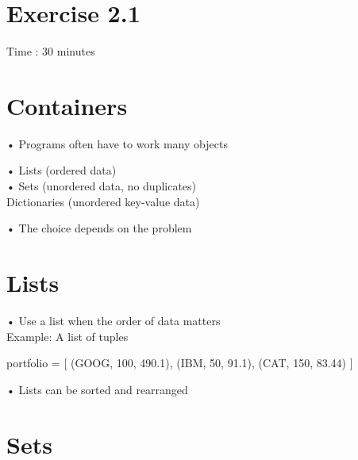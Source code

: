\documentclass[
  letterpaper,
  DIV=11,
  numbers=noendperiod]{scrreprt}
\newenvironment{Shaded}{\begin{snugshade}}{\end{snugshade}}
\newcommand{\DecValTok}[1]{\textcolor[rgb]{0.68,0.00,0.00}{#1}}
\newcommand{\FloatTok}[1]{\textcolor[rgb]{0.68,0.00,0.00}{#1}}
\newcommand{\NormalTok}[1]{\textcolor[rgb]{0.00,0.23,0.31}{#1}}
\newcommand{\OperatorTok}[1]{\textcolor[rgb]{0.37,0.37,0.37}{#1}}
\newcommand{\StringTok}[1]{\textcolor[rgb]{0.13,0.47,0.30}{#1}}
\begin{document}

\chapter{Exercise 2.1}\label{exercise-2.1}

Time : 30 minutes


\chapter{Containers}\label{containers}

• Programs often have to work many objects

• Lists (ordered data)\\
• Sets (unordered data, no duplicates)\\
Dictionaries (unordered key-value data)

• The choice depends on the problem


\chapter{Lists}\label{lists}

• Use a list when the order of data matters\\
Example: A list of tuples

\begin{Shaded}
\begin{Highlighting}[]
\NormalTok{portfolio }\OperatorTok{=}\NormalTok{ [}
\NormalTok{    (}\StringTok{\textquotesingle{}GOOG\textquotesingle{}}\NormalTok{, }\DecValTok{100}\NormalTok{, }\FloatTok{490.1}\NormalTok{),}
\NormalTok{    (}\StringTok{\textquotesingle{}IBM\textquotesingle{}}\NormalTok{, }\DecValTok{50}\NormalTok{, }\FloatTok{91.1}\NormalTok{),}
\NormalTok{    (}\StringTok{\textquotesingle{}CAT\textquotesingle{}}\NormalTok{, }\DecValTok{150}\NormalTok{, }\FloatTok{83.44}\NormalTok{)}
\NormalTok{] }
\end{Highlighting}
\end{Shaded}

• Lists can be sorted and rearranged


\chapter{Sets}\label{sets}
\end{document}

